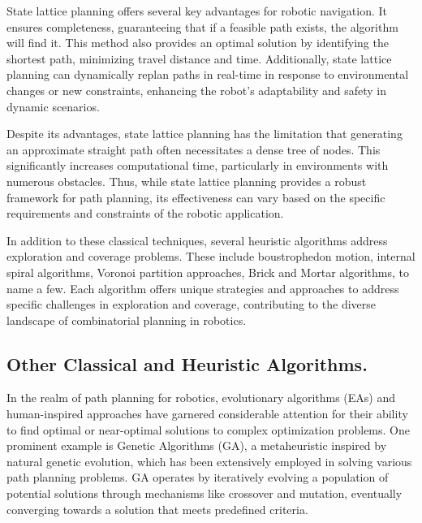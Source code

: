 \vspace*{6mm}

State lattice planning offers several key advantages for robotic navigation. It ensures completeness, guaranteeing that if a feasible path exists, the algorithm will find it. This method also provides an optimal solution by identifying the shortest path, minimizing travel distance and time. Additionally, state lattice planning can dynamically replan paths in real-time in response to environmental changes or new constraints, enhancing the robot’s adaptability and safety in dynamic scenarios. 

\vspace*{6mm}

Despite its advantages, state lattice planning has the limitation that generating an approximate straight path often necessitates a dense tree of nodes. This significantly increases computational time, particularly in environments with numerous obstacles. Thus, while state lattice planning provides a robust framework for path planning, its effectiveness can vary based on the specific requirements and constraints of the robotic application.

\vspace*{6mm}


In addition to these classical techniques, several heuristic algorithms address exploration and coverage problems. These include boustrophedon motion, internal spiral algorithms, Voronoi partition approaches, Brick and Mortar algorithms, to name a few. Each algorithm offers unique strategies and approaches to address specific challenges in exploration and coverage, contributing to the diverse landscape of combinatorial planning in robotics.



\subsection{Other Classical and Heuristic Algorithms.}

In the realm of path planning for robotics, evolutionary algorithms (EAs) and human-inspired approaches have garnered considerable attention for their ability to find optimal or near-optimal solutions to complex optimization problems. One prominent example is Genetic Algorithms (GA), a metaheuristic inspired by natural genetic evolution, which has been extensively employed in solving various path planning problems. GA operates by iteratively evolving a population of potential solutions through mechanisms like crossover and mutation, eventually converging towards a solution that meets predefined criteria.

